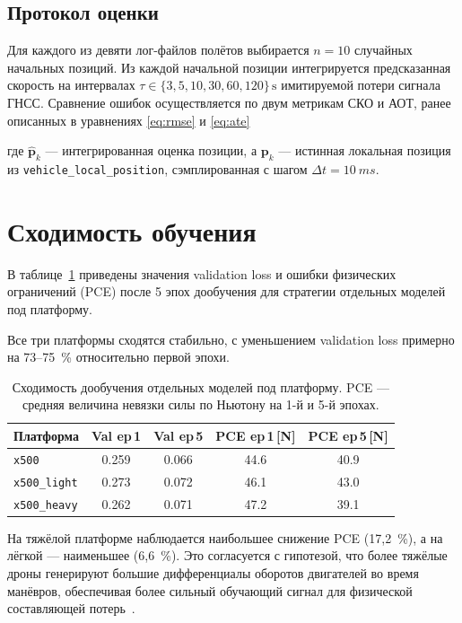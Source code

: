 \subsection{Протокол оценки}
\label{subsec:mp_eval}

Для каждого из девяти лог-файлов полётов выбирается $n=10$ случайных начальных позиций.
Из каждой начальной позиции интегрируется предсказанная скорость на интервалах $\tau \in \{3, 5, 10, 30, 60, 120\}\,\text{s}$ имитируемой потери сигнала ГНСС. Сравнение ошибок осуществляется по двум метрикам СКО и АОТ, ранее описанных в уравнениях  \ref{eq:rmse} и \ref{eq:ate}


где $\hat{\mathbf{p}}_k$ — интегрированная оценка позиции, а $\mathbf{p}_k$ — истинная локальная позиция из \texttt{vehicle\_local\_position}, сэмплированная с шагом $\Delta t = \SI{10}{ms}$.

\section{Сходимость обучения}
\label{sec:mp_convergence}

В таблице~\ref{tab:convergence} приведены значения validation loss и ошибки физических ограничений (PCE) после 5 эпох дообучения для стратегии отдельных моделей под платформу.

Все три платформы сходятся стабильно, с уменьшением validation loss примерно на 73–75~\% относительно первой эпохи.

\begin{table}[htbp]
	\centering
	\caption{Сходимость дообучения отдельных моделей под платформу.
		PCE — средняя величина невязки силы по Ньютону на 1-й и 5-й эпохах.}
	\label{tab:convergence}
	\begin{tabular}{lcccc}
		\toprule
		\textbf{Платформа} & \textbf{Val ep\,1} & \textbf{Val ep\,5} &
		\textbf{PCE ep\,1\,[N]} & \textbf{PCE ep\,5\,[N]} \\
		\midrule
		\texttt{x500}        & 0.259 & 0.066 & 44.6 & 40.9 \\
		\texttt{x500\_light} & 0.273 & 0.072 & 46.1 & 43.0 \\
		\texttt{x500\_heavy} & 0.262 & 0.071 & 47.2 & 39.1 \\
		\bottomrule
	\end{tabular}
\end{table}

На тяжёлой платформе наблюдается наибольшее снижение PCE (17{,}2~\%), а на лёгкой — наименьшее (6{,}6~\%).
Это согласуется с гипотезой, что более тяжёлые дроны генерируют большие дифференциалы оборотов двигателей во время манёвров, обеспечивая более сильный обучающий сигнал для физической составляющей потерь~\cite{pinn_physics_loss}.

